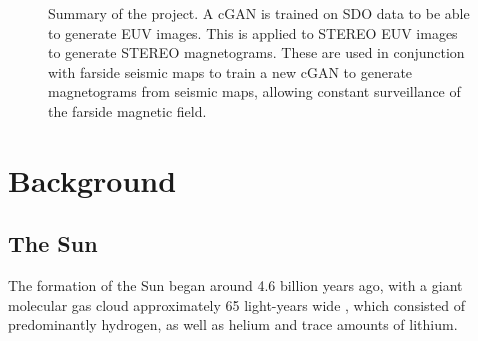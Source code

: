 \documentclass[11pt,a4paper,onecolumn]{report}
\begin{document}
\begin{figure}
  \centering
  \caption[Project Pipeline]{Summary of the project. A cGAN is trained on SDO
    data to be able to generate EUV images. This is applied to STEREO EUV images
    to generate STEREO magnetograms. These are used in conjunction with farside
    seismic maps to train a new cGAN to generate magnetograms from seismic maps,
    allowing constant surveillance of the farside magnetic field.}
  \label{fig:Project_summary}
\end{figure}






%
%
%
%
%
%
\chapter{Background}
%
%
%
%
%
%


%
%
%
%
%
%

\section{The Sun}
\label{sec:Sun}

The formation of the Sun began around 4.6 billion years ago, with a giant
molecular gas cloud approximately 65 light-years wide
\citep{montmerle_solar_2006}, which consisted of predominantly hydrogen, as well
as helium and trace amounts of lithium. \\
\end{document}
